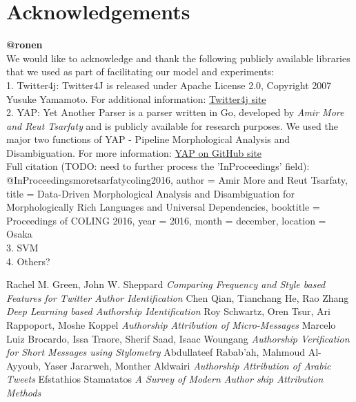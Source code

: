 \documentclass[a4paper]{article}
\begin{document}
\section{Acknowledgements}
\label{Acknowledgements}
\textbf{@ronen}\\
We would like to acknowledge and thank the following publicly available libraries that we used as part of facilitating our model and experiments:\\
1. Twitter4j: Twitter4J is released under Apache License 2.0, Copyright 2007 Yusuke Yamamoto. For additional information: 
	\href{http://twitter4j.org/en/index.html}{Twitter4j site}\\
2. YAP: Yet Another Parser is a parser written in Go, developed by \emph{Amir More and Reut Tsarfaty} and is publicly available for research purposes. We used the major two functions of YAP - Pipeline Morphological Analysis and Disambiguation. For more information: 
		\href{https://github.com/habeanf/yap}{YAP on GitHub site}\\
Full citation (TODO: need to further process the 'InProceedings' field):\\
@InProceedings{moretsarfatycoling2016,
  author = {Amir More and Reut Tsarfaty},
  title = {Data-Driven Morphological Analysis and Disambiguation for Morphologically Rich Languages and Universal Dependencies},
  booktitle = {Proceedings of COLING 2016},
  year = {2016},
  month = {december},
  location = {Osaka}
}\\
3. SVM\\
4. Others?\\ 


\begin{thebibliography}{9}

	Rachel M. Green, John W. Sheppard
	\textit{Comparing Frequency and Style based Features for Twitter Author Identification}
	Chen Qian, Tianchang He, Rao Zhang
	\textit{Deep Learning based Authorship Identification}
	Roy Schwartz, Oren Tsur, Ari Rappoport, Moshe Koppel
	\textit{Authorship Attribution of Micro-Messages}
	Marcelo Luiz Brocardo, Issa Traore, Sherif Saad, Isaac Woungang
	\textit{Authorship Verification for Short Messages using Stylometry}
	Abdullateef Rabab’ah, Mahmoud Al-Ayyoub, Yaser Jararweh, Monther Aldwairi
	\textit{Authorship Attribution of Arabic Tweets}
	Efstathios Stamatatos
	\textit{A Survey of Modern Author ship Attribution Methods}
	
\end{thebibliography}
\end{document}
